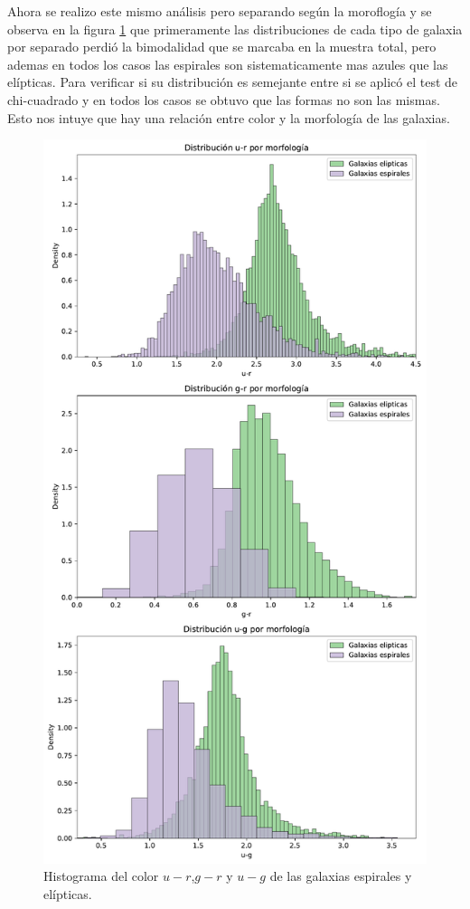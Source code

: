 \documentclass[twocolumn]{article}
\begin{document}
Ahora se realizo este mismo análisis pero separando según la moroflogía y se observa en la figura \ref{fig:color_forma} que primeramente las distribuciones de cada tipo de galaxia por separado perdió la bimodalidad que se marcaba en la muestra total, pero ademas en todos los casos las espirales son sistematicamente mas azules que las elípticas. 
Para verificar si su distribución es semejante entre si se aplicó el test de chi-cuadrado y en todos los casos se obtuvo que las formas no son las mismas. Esto nos intuye que hay una relación entre color y la morfología de las galaxias.

\begin{figure}[t]
\includegraphics[width=\linewidth]{colores_morfologia_vertical.pdf}
\caption{Histograma del color $u-r$,$g-r$ y $u-g$  de las galaxias espirales y elípticas.}
\label{fig:color_forma}
\end{figure}
\end{document}
